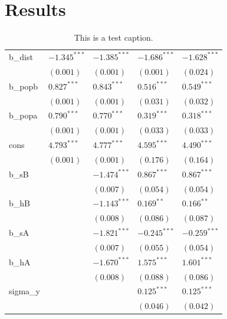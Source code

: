 \documentclass[a4paper,fleqn]{cas-dc}
\begin{document}
{{\section{Results}

\begin{table}[width=.9\textwidth,cols = 4, pos=h]
  \caption{This is a test caption.}
  \begin{tabular*}{\tblwidth}{@{} LLLLL @{} }
   \toprule
b\_dist      &$-1.345^{***}$ &$ -1.385^{***}$ &$ -1.686^{***} $&$ -1.628^{***}$ \\
             &$(0.001)    $ & $(0.001)    $ &$(0.001)      $&$(0.024)     $\\
    b\_popb  &$0.827^{***} $ &$ 0.843^{***} $ &$ 0.516^{***}  $&$ 0.549^{***}  $\\
             &$(0.001)    $ & $(0.001)    $ &$(0.031)      $&$(0.032)     $\\
b\_popa      &$0.790^{***} $ &$ 0.770^{***} $ &$ 0.319^{***}  $&$ 0.318^{***}  $\\
             &$(0.001)    $ & $(0.001)    $ &$(0.033)      $&$(0.033)     $\\
cons         &$4.793^{***} $ &$ 4.777^{***} $ &$ 4.595^{***}  $&$ 4.490^{***} $ \\
             &$(0.001)    $ & $(0.001)    $ &$(0.176)      $&$(0.164)     $\\
b\_sB        &              & $-1.474^{***}$ &$ 0.867^{***}  $&$ 0.867^{***} $  \\
             &              & $(0.007)    $ &$(0.054)      $&$(0.054)     $\\
b\_hB        &              & $-1.143^{***}$ &$ 0.169^{**}   $&$ 0.166^{**} $  \\
             &              & $(0.008)    $ &$(0.086)      $&$(0.087)     $\\
b\_sA        &              & $-1.821^{***}$ &$ -0.245^{***} $&$ -0.259^{***}$ \\
             &              & $(0.007)    $ &$(0.055)      $&$(0.054)     $\\
b\_hA        &              & $-1.670^{***}$ &$ 1.575^{***}  $& $1.601^{***} $  \\
             &              & $(0.008)    $ &$(0.088)     $ &$(0.086)     $\\
sigma\_y     &              &               &$0.125^{***}  $ & $ 0.125^{***}$ \\
             &              &               &$(0.046)     $ &$(0.042)     $\\

\end{tabular*}
\end{table}}}
\end{document}
